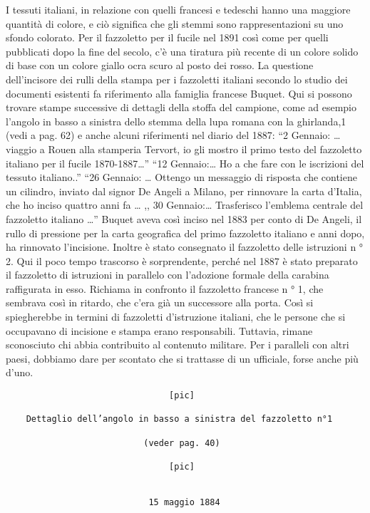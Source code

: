 I tessuti italiani, in relazione con quelli francesi e tedeschi hanno
una maggiore quantità di colore, e ciò significa che gli stemmi sono
rappresentazioni su uno sfondo colorato. Per il fazzoletto per il fucile
nel 1891 così come per quelli pubblicati dopo la fine del secolo, c'è
una tiratura più recente di un colore solido di base con un colore
giallo ocra scuro al posto dei rosso. La questione dell'incisore dei
rulli della stampa per i fazzoletti italiani secondo lo studio dei
documenti esistenti fa riferimento alla famiglia francese Buquet. Qui si
possono trovare stampe successive di dettagli della stoffa del campione,
come ad esempio l'angolo in basso a sinistra dello stemma della lupa
romana con la ghirlanda,1 (vedi a pag. 62) e anche alcuni riferimenti
nel diario del 1887: ``2 Gennaio: \ldots{} viaggio a Rouen alla
stamperia Tervort, io gli mostro il primo testo del fazzoletto italiano
per il fucile 1870-1887\ldots{}'' ``12 Gennaio:\ldots{} Ho a che fare
con le iscrizioni del tessuto italiano..'' ``26 Gennaio: \ldots{}
Ottengo un messaggio di risposta che contiene un cilindro, inviato dal
signor De Angeli a Milano, per rinnovare la carta d'Italia, che ho
inciso quattro anni fa \ldots{} ,, 30 Gennaio:\ldots{} Trasferisco
l'emblema centrale del fazzoletto italiano \ldots{}'' Buquet aveva così
inciso nel 1883 per conto di De Angeli, il rullo di pressione per la
carta geografica del primo fazzoletto italiano e anni dopo, ha rinnovato
l'incisione. Inoltre è stato consegnato il fazzoletto delle istruzioni n
° 2. Qui il poco tempo trascorso è sorprendente, perché nel 1887 è stato
preparato il fazzoletto di istruzioni in parallelo con l'adozione
formale della carabina raffigurata in esso. Richiama in confronto il
fazzoletto francese n ° 1, che sembrava così in ritardo, che c'era già
un successore alla porta. Così si spiegherebbe in termini di fazzoletti
d'istruzione italiani, che le persone che si occupavano di incisione e
stampa erano responsabili. Tuttavia, rimane sconosciuto chi abbia
contribuito al contenuto militare. Per i paralleli con altri paesi,
dobbiamo dare per scontato che si trattasse di un ufficiale, forse anche
più d'uno.

\begin{verbatim}
                                [pic]

    Dettaglio dell’angolo in basso a sinistra del fazzoletto n°1

                           (veder pag. 40)

                                [pic]


                            15 maggio 1884
\end{verbatim}


